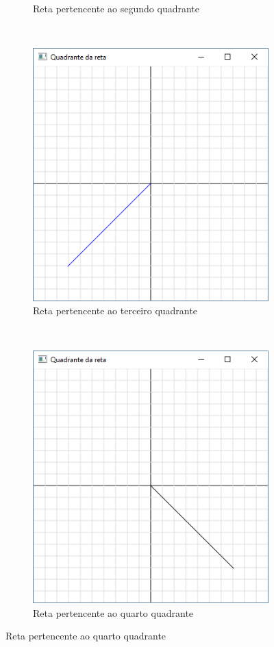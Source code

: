 \begin{enumerate}
\begin{figure}[h!]
\begin{subfigure}{0.2\textwidth}
        \caption{Reta pertencente ao segundo quadrante}
        \label{fig:cap01_ex4b}
    \end{subfigure}
    ~
    \begin{subfigure}{0.2\textwidth}
        \centerline{\includegraphics[width=.9\textwidth]{img/cap1_ex4c}}
        \caption{Reta pertencente ao terceiro quadrante}
        \label{fig:cap01_ex4c}
    \end{subfigure}
    ~
    \begin{subfigure}{0.2\textwidth}
        \centerline{\includegraphics[width=.9\textwidth]{img/cap1_ex4d}}
        \caption{Reta pertencente ao quarto quadrante}
        \label{fig:cap01_ex4d}
    \end{subfigure}


\end{figure}
\end{enumerate}
